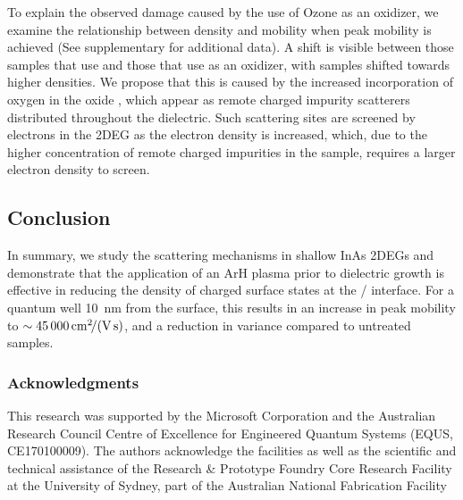 To explain the observed damage caused by the use of Ozone as an oxidizer, we examine the relationship between density and mobility when peak mobility is achieved (See supplementary for additional data). A shift is visible between those samples that use  and those that use  as an oxidizer, with  samples shifted towards higher densities. We propose that this is caused by the increased incorporation of oxygen in the oxide \cite{10.1021/cm0608903}, which appear as remote charged impurity scatterers \cite{scattering} distributed throughout the dielectric. Such scattering sites are screened by electrons in the 2DEG as the electron density is increased, which, due to the higher concentration of remote charged impurities in the sample, requires a larger electron density to screen.

\subsection{Conclusion}
In summary, we study the scattering mechanisms in shallow InAs 2DEGs and demonstrate that the application of an ArH plasma prior to dielectric growth is effective in reducing the density of charged surface states at the / interface. For a quantum well \SI{10}{\nano\meter} from the surface, this results in an increase in peak mobility to $\sim \mob{45000}$, and a reduction in variance compared to untreated samples.

\subsubsection{Acknowledgments}
This research was supported by the Microsoft Corporation and the Australian Research Council Centre of Excellence for Engineered Quantum Systems (EQUS, CE170100009). The authors acknowledge the facilities as well as the scientific and technical assistance of the Research \& Prototype Foundry Core Research Facility at the University of Sydney, part of the Australian National Fabrication Facility
